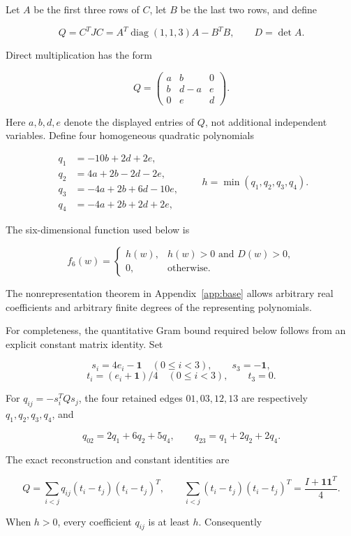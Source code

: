 \documentclass[11pt]{article}
\begin{document}
Let \(A\) be the first three rows of \(C\), let \(B\) be the last two
rows, and define

\[
Q=C^TJC=A^T\operatorname{diag}(1,1,3)A-B^TB,
\qquad D=\det A.
\tag{Q2}
\]

Direct multiplication has the form

\[
Q=\begin{pmatrix}a&b&0\\b&d-a&e\\0&e&d\end{pmatrix}.
\tag{Q3}
\]

Here \(a,b,d,e\) denote the displayed entries of \(Q\), not additional
independent variables. Define four homogeneous quadratic polynomials

\[
\begin{aligned}
q_1&=-10b+2d+2e,\\
q_2&=4a+2b-2d-2e,\\
q_3&=-4a+2b+6d-10e,\\
q_4&=-4a+2b+2d+2e,
\end{aligned}
\qquad h=\min(q_1,q_2,q_3,q_4).
\tag{Q4}
\]

The six-dimensional function used below is

\[
f_6(w)=
\begin{cases}
h(w),& h(w)>0\text{ and }D(w)>0,\\
0,&\text{otherwise}.
\end{cases}
\tag{Q5}
\]

The nonrepresentation theorem in Appendix~\ref{app:base} allows arbitrary real coefficients and
arbitrary finite degrees of the representing polynomials.

For completeness, the quantitative Gram bound required below follows
from an explicit constant matrix identity. Set

\[
s_i=4e_i-\mathbf1\quad(0\le i<3),\qquad s_3=-\mathbf1,
\]
\[
t_i=(e_i+\mathbf1)/4\quad(0\le i<3),\qquad t_3=0.
\]

For \(q_{ij}=-s_i^TQs_j\), the four retained edges
\(01,03,12,13\) are respectively \(q_1,q_2,q_3,q_4\), and

\[
q_{02}=2q_1+6q_2+5q_4,\qquad
q_{23}=q_1+2q_2+2q_4.
\tag{Q6}
\]

The exact reconstruction and constant identities are

\[
Q=\sum_{i<j}q_{ij}(t_i-t_j)(t_i-t_j)^T,
\qquad
\sum_{i<j}(t_i-t_j)(t_i-t_j)^T
=\frac{I+\mathbf1\mathbf1^T}{4}.
\tag{Q7}
\]

When \(h>0\), every coefficient \(q_{ij}\) is at least \(h\).
Consequently
\end{document}
